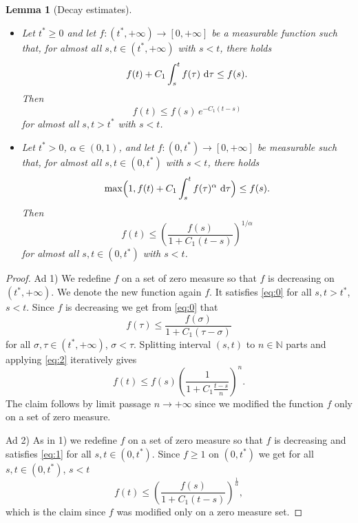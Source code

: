 \documentclass[11pt, a4paper, reqno]{amsart}
\newtheorem{lemma}[theorem]{Lemma}
\newcommand{\N}{\mathbb N}
\numberwithin{equation}{section}
\newcommand{\dtau}{\,{\rm d} \tau}
\newcommand{\tstar}{t^*}
\begin{document}
\begin{lemma}[Decay estimates]\label{lem:decay} \ 
\begin{itemize}[left=0pt]
\item[1)]
Let $\tstar \geq 0$ and let $f : (\tstar, +\infty) \to [0, +\infty]$ be a measurable function such that, for almost all $s, t \in (\tstar, +\infty)$ with $s < t$, there holds
\begin{equation}\label{eq:0}
f(t) + C_1 \int_s^t f(\tau) \, \dtau \leq f(s).
\end{equation}
Then
$$
f(t) \leq f(s) \, e^{-C_1 (t-s)}
$$
for almost all $s, t > \tstar$ with $s < t$.

\item[2)] Let $\tstar > 0$, $\alpha \in (0,1)$, and let $f : (0, \tstar) \to [0, +\infty]$ be measurable such that, for almost all $s, t \in (0, \tstar)$ with $s < t$, there holds
\begin{equation}\label{eq:1}
\max\Bigl(1, f(t) + C_1 \int_s^t f(\tau)^\alpha \, \dtau \Bigr) \leq f(s).
\end{equation}
Then
$$
f(t) \leq \left(\frac{f(s)}{1 + C_1 (t-s)}\right)^{1/\alpha}
$$
for almost all $s, t \in (0, \tstar)$ with $s < t$.

\end{itemize}
\end{lemma}
\begin{proof}
  Ad 1)
  We redefine $f$ on a set of zero measure so that $f$ is decreasing on $(\tstar,+\infty)$. We denote the new function again $f$. It satisfies  \eqref{eq:0} for all $s,t>\tstar$, $s<t$. Since $f$ is decreasing we get from \eqref{eq:0} that 
  \begin{equation}\label{eq:2}
  f(\tau)\leq\frac{f(\sigma)}{1+C_1(\tau-\sigma)}
\end{equation}
for all $\sigma,\tau\in(\tstar,+\infty)$, $\sigma<\tau$.
Splitting interval $(s,t)$ to $n\in\N$ parts and applying \eqref{eq:2} iteratively gives
$$
  f(t)\leq f(s)\left(\frac1{1+C_1\frac{t-s}n}\right)^n.
$$
The claim follows by limit passage $n\to+\infty$ since we modified the function $f$ only on a set of zero measure.

Ad 2) As in 1) we redefine $f$ on a set of zero measure so that $f$ is decreasing and satisfies \eqref{eq:1} for all $s,t\in(0,\tstar)$. Since $f\geq 1$ on $(0,\tstar)$ we get for all $s,t\in (0,\tstar)$, $s<t$
  $$
  f(t)\leq \left(\frac{f(s)}{1+C_1(t-s)}\right)^{\frac1\alpha},
  $$
  which is the claim since $f$ was modified only on a zero measure set.  
\end{proof}
\end{document}
